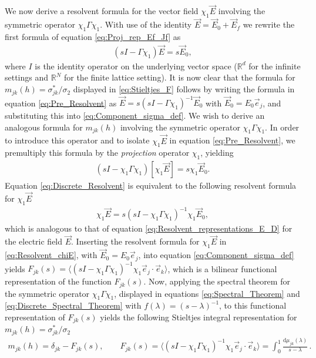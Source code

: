 \documentclass{cmslatex}
\renewcommand{\d}{\text{d}}
\begin{document}
We now derive a resolvent formula for the vector field
$\chi_1\vec{E}$ involving the symmetric operator $\chi_1\Gamma\chi_1$. With use of the
identity $\vec{E}=\vec{E}_0+\vec{E}_f$ we rewrite the first formula of
equation \eqref{eq:Proj_rep_Ef_Jf} as  
%
\begin{align}\label{eq:Pre_Resolvent}
  (sI-\Gamma\chi_1)\vec{E}=s\vec{E}_0,
\end{align}
%
where $I$ is the identity operator on the underlying vector space
($\mathbb{R}^d$ for the infinite settings and $\mathbb{R}^N$ for the
finite lattice setting). It is now clear that the formula for
$m_{jk}(h)=\sigma^*_{jk}/\sigma_2$ displayed in \eqref{eq:Stieltjes_F} follows by writing
the formula in equation \eqref{eq:Pre_Resolvent} as
$\vec{E}=s(sI-\Gamma\chi_1)^{-1}\vec{E}_0$ with $\vec{E}_0=E_0\vec{e}_j$, and
substituting this into \eqref{eq:Component_sigma_def}. We wish to derive an
analogous formula for $m_{jk}(h)$ involving the symmetric operator
$\chi_1\Gamma\chi_1$. In order to introduce this operator and to isolate
$\chi_1\vec{E}$ in equation \eqref{eq:Pre_Resolvent}, we premultiply
this formula by the \emph{projection} operator $\chi_1$, yielding 
%
\begin{align}\label{eq:Discrete_Resolvent}
  (sI-\chi_1\Gamma\chi_1)[\chi_1\vec{E}]=s\chi_1\vec{E}_0.
\end{align}
%
Equation \eqref{eq:Discrete_Resolvent} is equivalent to the following
resolvent formula for $\chi_1\vec{E}$
%
\begin{align}\label{eq:Resolvent_chiE}
  \chi_1\vec{E}=s(sI-\chi_1\Gamma\chi_1)^{-1}\chi_1\vec{E}_0,
\end{align}
%
which is analogous to that of equation
\eqref{eq:Resolvent_representations_E_D} for the electric field
$\vec{E}$. Inserting the resolvent formula for $\chi_1\vec{E}$ in
\eqref{eq:Resolvent_chiE}, with $\vec{E}_0=E_0\vec{e}_j$, into
equation \eqref{eq:Component_sigma_def} yields
$F_{jk}(s)=\langle(sI-\chi_1\Gamma\chi_1)^{-1}\chi_1\vec{e}_j\cdot\vec{e}_k\rangle$, which is a
bilinear functional representation of the function
$F_{jk}(s)$. Now, applying the spectral theorem for the symmetric
operator $\chi_1\Gamma\chi_1$, displayed in equations \eqref{eq:Spectral_Theorem} and
\eqref{eq:Discrete_Spectral_Theorem} with $f(\lambda)=(s-\lambda)^{-1}$, to this
functional representation of $F_{jk}(s)$ yields the following
Stieltjes integral representation for $m_{jk}(h)=\sigma^*_{jk}/\sigma_2$ 
%
\begin{align}\label{eq:Stieltjes_m}
  m_{jk}(h)=\delta_{jk}-F_{jk}(s), \qquad
  F_{jk}(s)=\langle(sI-\chi_1\Gamma\chi_1)^{-1}\chi_1\vec{e}_j\cdot\vec{e}_k\rangle=\int_0^1\frac{\d\mu_{jk}(\lambda)}{s-\lambda}\,.
\end{align}
%
\end{document}
